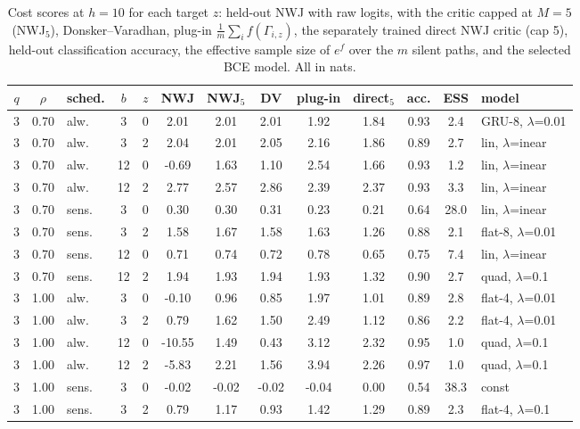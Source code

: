 \begin{table}[htbp]
\centering
\scriptsize
\caption{Cost scores at $h=10$ for each target $z$: held-out NWJ with raw logits, with the critic capped at $M=5$ (NWJ$_5$), Donsker--Varadhan, plug-in $\frac1m\sum_i f(\Gamma_{i,z})$, the separately trained direct NWJ critic (cap 5), held-out classification accuracy, the effective sample size of $e^{f}$ over the $m$ silent paths, and the selected BCE model. All in nats.}\label{tab:cost}
\begin{adjustbox}{max width=\textwidth}
\begin{tabular}{cclcc cccc c cc l}
\toprule
$q$ & $\rho$ & sched. & $b$ & $z$ & NWJ & NWJ$_5$ & DV & plug-in & direct$_5$ & acc. & ESS & model \\
\midrule
3 & 0.70 & alw. & 3 & 0 & 2.01 & 2.01 & 2.01 & 1.92 & 1.84 & 0.93 & 2.4 & GRU-8, $\lambda$=0.01 \\
3 & 0.70 & alw. & 3 & 2 & 2.04 & 2.01 & 2.05 & 2.16 & 1.86 & 0.89 & 2.7 & lin, $\lambda$=inear \\
3 & 0.70 & alw. & 12 & 0 & -0.69 & 1.63 & 1.10 & 2.54 & 1.66 & 0.93 & 1.2 & lin, $\lambda$=inear \\
3 & 0.70 & alw. & 12 & 2 & 2.77 & 2.57 & 2.86 & 2.39 & 2.37 & 0.93 & 3.3 & lin, $\lambda$=inear \\
3 & 0.70 & sens. & 3 & 0 & 0.30 & 0.30 & 0.31 & 0.23 & 0.21 & 0.64 & 28.0 & lin, $\lambda$=inear \\
3 & 0.70 & sens. & 3 & 2 & 1.58 & 1.67 & 1.58 & 1.63 & 1.26 & 0.88 & 2.1 & flat-8, $\lambda$=0.01 \\
3 & 0.70 & sens. & 12 & 0 & 0.71 & 0.74 & 0.72 & 0.78 & 0.65 & 0.75 & 7.4 & lin, $\lambda$=inear \\
3 & 0.70 & sens. & 12 & 2 & 1.94 & 1.93 & 1.94 & 1.93 & 1.32 & 0.90 & 2.7 & quad, $\lambda$=0.1 \\
3 & 1.00 & alw. & 3 & 0 & -0.10 & 0.96 & 0.85 & 1.97 & 1.01 & 0.89 & 2.8 & flat-4, $\lambda$=0.01 \\
3 & 1.00 & alw. & 3 & 2 & 0.79 & 1.62 & 1.50 & 2.49 & 1.12 & 0.86 & 2.2 & flat-4, $\lambda$=0.01 \\
3 & 1.00 & alw. & 12 & 0 & -10.55 & 1.49 & 0.43 & 3.12 & 2.32 & 0.95 & 1.0 & quad, $\lambda$=0.1 \\
3 & 1.00 & alw. & 12 & 2 & -5.83 & 2.21 & 1.56 & 3.94 & 2.26 & 0.97 & 1.0 & quad, $\lambda$=0.1 \\
3 & 1.00 & sens. & 3 & 0 & -0.02 & -0.02 & -0.02 & -0.04 & 0.00 & 0.54 & 38.3 & const \\
3 & 1.00 & sens. & 3 & 2 & 0.79 & 1.17 & 0.93 & 1.42 & 1.29 & 0.89 & 2.3 & flat-4, $\lambda$=0.1 \\

\end{tabular}
\end{adjustbox}
\end{table}
